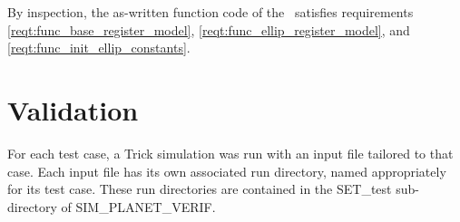 \label{inspect:func_reqts}
By inspection, the as-written function code of the \planetDesc\
satisfies requirements \ref{reqt:func_base_register_model},
\ref{reqt:func_ellip_register_model}, and \ref{reqt:func_init_ellip_constants}.


\section{Validation}
For each test case, a Trick simulation was run with an input file tailored
to that case. Each input file has its own associated run directory, named
appropriately for its test case. These run directories are contained in the
SET\_test sub-directory of SIM\_PLANET\_VERIF.


\label{test:init_eellip}

